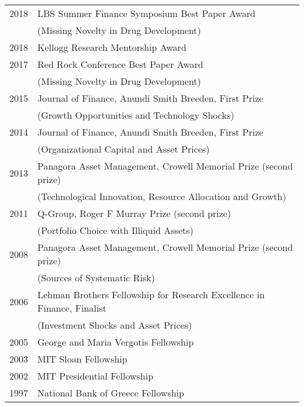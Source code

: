 \documentclass[11pt,letterpaper,serif,overlapped]{res}
\begin{document}
\begin{resume}
\begin{itemize}
\begin{longtable}{ll}
2018 & LBS  Summer Finance Symposium Best Paper Award \\ &  (Missing Novelty in Drug Development)\\
2018 & Kellogg Research Mentorship Award\\
2017 & Red Rock Conference Best Paper Award \\ &  (Missing Novelty in Drug Development)\\
2015 &  Journal of Finance, Anundi Smith Breeden, First Prize\\ &  (Growth Opportunities and Technology Shocks)\\
2014 & Journal of Finance, Anundi Smith Breeden, First Prize \\ & (Organizational Capital and Asset Prices)\\
2013 & Panagora Asset Management, Crowell Memorial Prize (second prize)\\& (Technological Innovation, Resource Allocation and Growth)\\
2011 & Q-Group, Roger F Murray Prize (second prize)\\ & (Portfolio Choice with Illiquid Assets)\\
2008 & Panagora Asset Management, Crowell Memorial Prize (second prize) \\ & (Sources of Systematic Risk) \\
2006  & Lehman Brothers Fellowship for Research Excellence in Finance, Finalist\\ & (Investment Shocks and Asset Prices)\\
2005 & George and Maria Vergotis Fellowship\\
2003& MIT Sloan Fellowship\\
2002 & MIT Presidential Fellowship\\
1997 & National Bank of Greece Fellowship \\
\end{longtable}





\vspace{0.5cm}


\end{itemize}
\end{resume}
\end{document}
